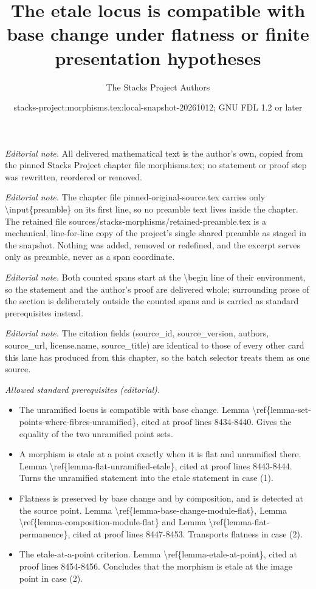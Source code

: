 \documentclass[10pt,a4paper]{amsart}
\title{The etale locus is compatible with base change under flatness or finite presentation hypotheses}
\author{The Stacks Project Authors}
\date{stacks-project:morphisms.tex:local-snapshot-20261012; GNU FDL 1.2 or later}
\theoremstyle{plain}
\theoremstyle{definition}
\theoremstyle{remark}
\numberwithin{equation}{subsection}
\begin{document}
\maketitle
\setcounter{subsection}{1}
\noindent\textit{Editorial note.} All delivered mathematical text is the author's own, copied from the pinned Stacks Project chapter file morphisms.tex; no statement or proof step was rewritten, reordered or removed.\par\medskip
\noindent\textit{Editorial note.} The chapter file pinned-original-source.tex carries only \textbackslash{}input\{preamble\} on its first line, so no preamble text lives inside the chapter. The retained file sources/stacks-morphisms/retained-preamble.tex is a mechanical, line-for-line copy of the project's single shared preamble as staged in the snapshot. Nothing was added, removed or redefined, and the excerpt serves only as preamble, never as a span coordinate.\par\medskip
\noindent\textit{Editorial note.} Both counted spans start at the \textbackslash{}begin line of their environment, so the statement and the author's proof are delivered whole; surrounding prose of the section is deliberately outside the counted spans and is carried as standard prerequisites instead.\par\medskip
\noindent\textit{Editorial note.} The citation fields (source\_id, source\_version, authors, source\_url, license.name, source\_title) are identical to those of every other card this lane has produced from this chapter, so the batch selector treats them as one source.\par\medskip
\noindent\textit{Allowed standard prerequisites (editorial).}\begin{itemize}
\item The unramified locus is compatible with base change. Lemma \textbackslash{}ref\{lemma-set-points-where-fibres-unramified\}, cited at proof lines 8434-8440. Gives the equality of the two unramified point sets.
\item A morphism is etale at a point exactly when it is flat and unramified there. Lemma \textbackslash{}ref\{lemma-flat-unramified-etale\}, cited at proof lines 8443-8444. Turns the unramified statement into the etale statement in case (1).
\item Flatness is preserved by base change and by composition, and is detected at the source point. Lemma \textbackslash{}ref\{lemma-base-change-module-flat\}, Lemma \textbackslash{}ref\{lemma-composition-module-flat\} and Lemma \textbackslash{}ref\{lemma-flat-permanence\}, cited at proof lines 8447-8453. Transports flatness in case (2).
\item The etale-at-a-point criterion. Lemma \textbackslash{}ref\{lemma-etale-at-point\}, cited at proof lines 8454-8456. Concludes that the morphism is etale at the image point in case (2).
\end{itemize}\medskip
\end{document}
